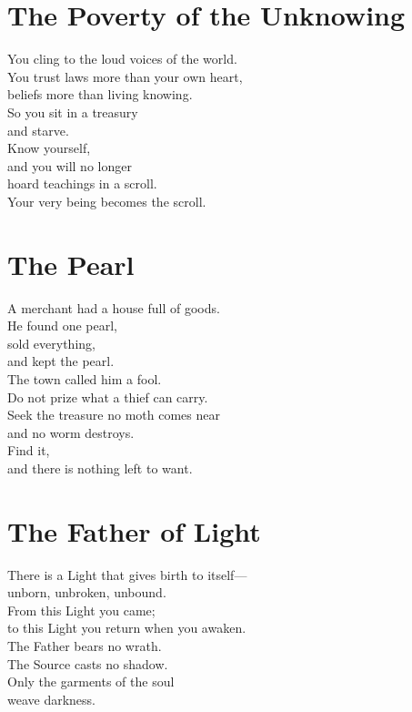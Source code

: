 \documentclass[10pt, openright]{book}
\newcommand{\sectionbreak}{\filbreak}
\newcommand{\sayingsource}[1]{\par\nopagebreak\vspace{0.3\baselineskip}{\raggedleft\footnotesize\itshape #1\par}}
\begin{document}
\sayingsource{Tao Te Ching 2 · Thomas 22 · Philip · Gospel of the
Egyptians · Hymn of the Pearl}

\sectionbreak

\section{The Poverty of the
Unknowing}\label{the-poverty-of-the-unknowing}

You cling to the loud voices of the world.\\
You trust laws more than your own heart,\\
beliefs more than living knowing.\\
So you sit in a treasury\\
and starve.\\
Know yourself,\\
and you will no longer\\
hoard teachings in a scroll.\\
Your very being becomes the scroll.

\sayingsource{Tao Te Ching 3 · Thomas 3}

\sectionbreak

\section{The Pearl}\label{the-pearl}

A merchant had a house full of goods.\\
He found one pearl,\\
sold everything,\\
and kept the pearl.\\
The town called him a fool.\\
Do not prize what a thief can carry.\\
Seek the treasure no moth comes near\\
and no worm destroys.\\
Find it,\\
and there is nothing left to want.

\sayingsource{Tao Te Ching 3 · Thomas 76 · Matthew 13:45--46 · Matthew
6:19--20}

\sectionbreak

\section{The Father of Light}\label{the-father-of-light}

There is a Light that gives birth to itself---\\
unborn, unbroken, unbound.\\
From this Light you came;\\
to this Light you return when you awaken.\\
The Father bears no wrath.\\
The Source casts no shadow.\\
Only the garments of the soul\\
weave darkness.
\end{document}
